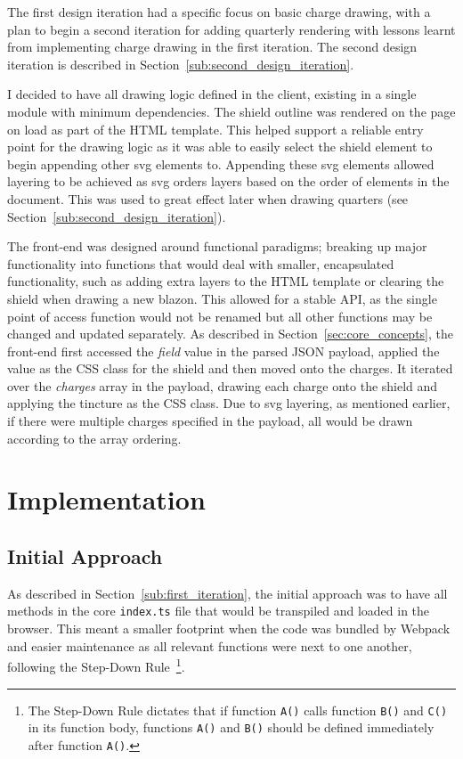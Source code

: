 \documentclass[nobib, a4paper, twoside, justified]{tufte-book}
\makeatletter
\newcommand{\svg}{\gls{svg}\@\xspace}
\newcommand{\charge}{\gls{charge}\@\xspace}
\newcommand{\charges}{\glspl{charge}\@\xspace}
\newcommand{\blazon}{\gls{blazon}\@\xspace}
\makeatother
\begin{document}
The first design iteration had a specific focus on basic \charge{} drawing, with a plan to begin a
second iteration for adding quarterly rendering with lessons learnt from implementing \charge{}
drawing in the first iteration. The second design iteration is described in
Section~\ref{sub:second_design_iteration}.

I decided to have all drawing logic defined in the client, existing in a single module with minimum
dependencies. The shield outline was rendered on the page on load as part of the HTML template.
This helped support a reliable entry point for the drawing logic as it was able to easily select
the shield element to begin appending other \svg{} elements to. Appending these \svg{} elements
allowed layering to be achieved as \svg{} orders layers based on the order of elements in the
document. This was used to great effect later when drawing quarters (see
Section~\ref{sub:second_design_iteration}).

The front-end was designed around functional paradigms; breaking up major functionality into
functions that would deal with smaller, encapsulated functionality, such as adding extra layers to
the HTML template or clearing the shield when drawing a new \blazon. This allowed for a stable API,
as the single point of access function would not be renamed but all other functions may be changed
and updated separately. As described in Section~\ref{sec:core_concepts}, the front-end first
accessed the \textit{field} value in the parsed JSON payload, applied the value as the CSS class
for the shield and then moved onto the \charges{}. It iterated over the \textit{\charges{}} array
in the payload, drawing each \charge{} onto the shield and applying the tincture as the CSS class.
Due to \svg{} layering, as mentioned earlier, if there were multiple \charges{} specified in the
payload, all would be drawn according to the array ordering.

\chapter{Implementation}%
\label{cha:implementation}

\section{Initial Approach}%
\label{sec:initial_approach}

As described in Section~\ref{sub:first_iteration}, the initial approach was to have all methods in
the core \texttt{index.ts} file that would be \gls{transpile}d and loaded in the browser. This
meant a smaller footprint when the code was bundled by Webpack and easier maintenance as all
relevant functions were next to one another, following the Step-Down
Rule~\autocite{martin2009clean}\footnote{The Step-Down Rule dictates that if function \texttt{A()}
calls function \texttt{B()} and \texttt{C()} in its function body, functions \texttt{A()} and
\texttt{B()} should be defined immediately after function \texttt{A()}.}.
\end{document}
